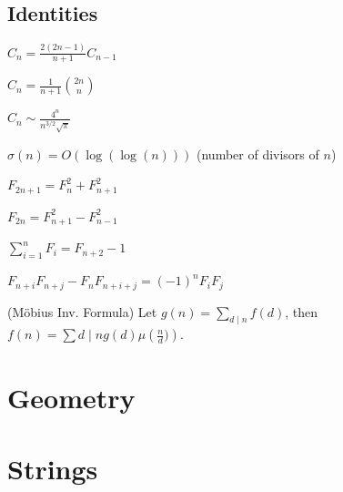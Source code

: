 \subsection{Identities}
{
$C_n = \frac{2(2n-1)}{n+1} C_{n-1}$

$C_n = \frac{1}{n+1} \binom{2n}{n}$

$C_n \sim \frac{4^n}{n^{3/2}\sqrt{\pi}}$

$\sigma(n) = O(\log(\log(n)))$ (number of divisors of $n$)

$F_{2n+1} = F_{n}^2 + F_{n+1}^2$

$F_{2n} = F_{n+1}^2 - F_{n-1}^2$

$\sum_{i=1}^n F_i = F_{n+2}-1$

$F_{n+i}F_{n+j} - F_nF_{n+i+j} = (-1)^n F_iF_j$

(Möbius Inv. Formula)
Let $g(n) = \sum_{d\mid n} f(d)$, then $f(n)=\sum{d\mid n} g(d) \mu\left(\frac{n}{d})\right)$.
}

\section{Geometry}


\section{Strings}


